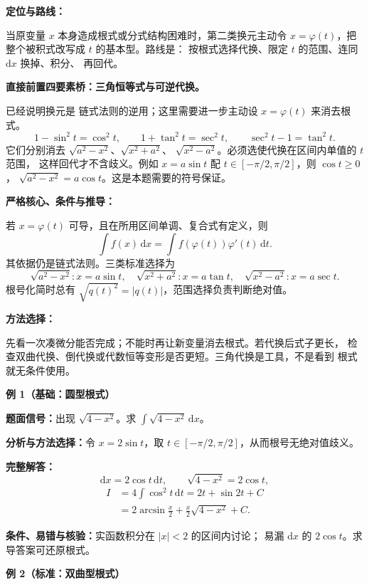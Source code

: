 \begin{knowledgeBox}
\textbf{定位与路线：}

当原变量 \(x\) 本身造成根式或分式结构困难时，第二类换元主动令
\(x=\varphi(t)\)，把整个被积式改写成 \(t\) 的基本型。路线是：
按根式选择代换、限定 \(t\) 的范围、连同 \(\mathrm dx\) 换掉、积分、
再回代。

\textbf{直接前置四要素桥：三角恒等式与可逆代换。}

已经说明换元是
链式法则的逆用；这里需要进一步主动设 \(x=\varphi(t)\) 来消去根式。
\[
1-\sin^2t=\cos^2t,\qquad
1+\tan^2t=\sec^2t,\qquad
\sec^2t-1=\tan^2t.
\]
它们分别消去
\(\sqrt{a^2-x^2}\)、\(\sqrt{x^2+a^2}\)、
\(\sqrt{x^2-a^2}\)。必须选使代换在区间内单值的 \(t\) 范围，
这样回代才不含歧义。例如 \(x=a\sin t\) 配
\(t\in[-\pi/2,\pi/2]\)，则 \(\cos t\ge0\)，
\(\sqrt{a^2-x^2}=a\cos t\)。这是本题需要的符号保证。

\textbf{严格核心、条件与推导：}

若 \(x=\varphi(t)\) 可导，且在所用区间单调、复合式有定义，则
\[
\boxed{\int f(x)\,\mathrm dx
=\int f(\varphi(t))\varphi'(t)\,\mathrm dt.}
\]
其依据仍是链式法则。三类标准选择为
\[
\sqrt{a^2-x^2}:x=a\sin t,\quad
\sqrt{x^2+a^2}:x=a\tan t,\quad
\sqrt{x^2-a^2}:x=a\sec t.
\]
根号化简时总有 \(\sqrt{q(t)^2}=|q(t)|\)，范围选择负责判断绝对值。

\textbf{方法选择：}

先看一次凑微分能否完成；不能时再让新变量消去根式。若代换后式子更长，
检查双曲代换、倒代换或代数恒等变形是否更短。三角代换是工具，不是看到
根式就无条件使用。

\textbf{例 1（基础：圆型根式）}

\textbf{题面信号：}出现 \(\sqrt{4-x^2}\)。求
\(\int\sqrt{4-x^2}\,\mathrm dx\)。

\textbf{分析与方法选择：}令 \(x=2\sin t\)，取
\(t\in[-\pi/2,\pi/2]\)，从而根号无绝对值歧义。

\textbf{完整解答：}
\[
\mathrm dx=2\cos t\,\mathrm dt,\qquad
\sqrt{4-x^2}=2\cos t,
\]
\[
\begin{aligned}
I&=4\int\cos^2t\,\mathrm dt
=2t+\sin2t+C\\
&=2\arcsin\frac x2+\frac x2\sqrt{4-x^2}+C.
\end{aligned}
\]

\textbf{条件、易错与核验：}实函数积分在 \(|x|<2\) 的区间内讨论；
易漏 \(\mathrm dx\) 的 \(2\cos t\)。求导答案可还原根式。

\textbf{例 2（标准：双曲型根式）}


\end{knowledgeBox}
